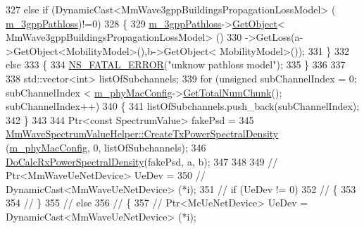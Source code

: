 \begin{DoxyCode}
327                         \textcolor{keywordflow}{else} \textcolor{keywordflow}{if} (DynamicCast<MmWave3gppBuildingsPropagationLossModel> (
      \hyperlink{classns3_1_1MmWave3gppChannel_add8860051acacb1819be2f7321dbd726}{m\_3gppPathloss})!=0)
328                         \{
329                                 \hyperlink{classns3_1_1MmWave3gppChannel_add8860051acacb1819be2f7321dbd726}{m\_3gppPathloss}->\hyperlink{classns3_1_1Object_a13e18c00017096c8381eb651d5bd0783}{GetObject}<
      MmWave3gppBuildingsPropagationLossModel> ()
330                                                 ->GetLoss(a->GetObject<MobilityModel>(),b->GetObject<
      MobilityModel>());
331                         \}
332                         \textcolor{keywordflow}{else}
333                         \{
334                                 \hyperlink{group__fatal_ga5131d5e3f75d7d4cbfd706ac456fdc85}{NS\_FATAL\_ERROR}(\textcolor{stringliteral}{"unknow pathloss model"});
335                         \}
336 
337 
338                         std::vector<int> listOfSubchannels;
339                         \textcolor{keywordflow}{for} (\textcolor{keywordtype}{unsigned} subChannelIndex = 0; subChannelIndex < 
      \hyperlink{classns3_1_1MmWave3gppChannel_a50988766af948ea236ce24718a6dca7d}{m\_phyMacConfig}->\hyperlink{classns3_1_1MmWavePhyMacCommon_a97e82c809a351fea9d5058ac1bb4c3c6}{GetTotalNumChunk}(); subChannelIndex++)
340                         \{
341                                 listOfSubchannels.push\_back(subChannelIndex);
342                         \}
343 
344                         Ptr<const SpectrumValue> fakePsd = 
345                                 
      \hyperlink{classns3_1_1MmWaveSpectrumValueHelper_a1a968ae81d81f346027fe474e7962148}{MmWaveSpectrumValueHelper::CreateTxPowerSpectralDensity}
       (\hyperlink{classns3_1_1MmWave3gppChannel_a50988766af948ea236ce24718a6dca7d}{m\_phyMacConfig}, 0, listOfSubchannels);
346                         \hyperlink{classns3_1_1MmWave3gppChannel_a598876f469ba922150b9d9b86e160ca0}{DoCalcRxPowerSpectralDensity}(fakePsd, a, b);
347 
348 
349                         \textcolor{comment}{// Ptr<MmWaveUeNetDevice> UeDev =}
350                         \textcolor{comment}{//                      DynamicCast<MmWaveUeNetDevice> (*i);}
351                         \textcolor{comment}{// if (UeDev != 0)}
352                         \textcolor{comment}{// \{}
353 
354                         \textcolor{comment}{// \}    }
355                         \textcolor{comment}{// else}
356                         \textcolor{comment}{// \{}
357                         \textcolor{comment}{//      Ptr<McUeNetDevice> UeDev = DynamicCast<MmWaveUeNetDevice> (*i);}

\end{DoxyCode}
